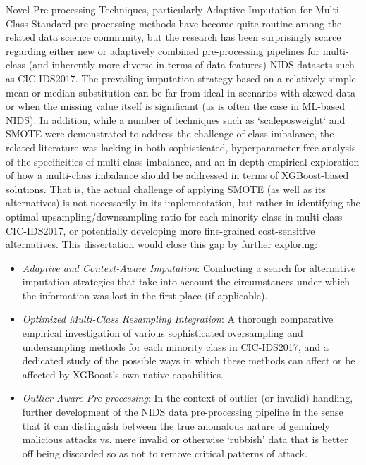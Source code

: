 Novel Pre-processing Techniques, particularly Adaptive Imputation for Multi-Class
Standard pre-processing methods have become quite routine among the related data science community, but the research has been surprisingly scarce regarding either new or adaptively combined pre-processing pipelines for multi-class (and inherently more diverse in terms of data features) NIDS datasets such as CIC-IDS2017. The prevailing imputation strategy based on a relatively simple mean or median substitution can be far from ideal in scenarios with skewed data or when the missing value itself is significant (as is often the case in ML-based NIDS). In addition, while a number of techniques such as `scale\textunderscore pos\textunderscore weight` and SMOTE were demonstrated to address the challenge of class imbalance, the related literature was lacking in both sophisticated, hyperparameter-free analysis of the specificities of multi-class imbalance, and an in-depth empirical exploration of how a multi-class imbalance should be addressed in terms of XGBoost-based solutions. That is, the actual challenge of applying SMOTE (as well as its alternatives) is not necessarily in its implementation, but rather in identifying the optimal upsampling/downsampling ratio for each minority class in multi-class CIC-IDS2017, or potentially developing more fine-grained cost-sensitive alternatives. This dissertation would close this gap by further exploring:
\begin{itemize}[noitemsep] 
\item \textit{Adaptive and Context-Aware Imputation}: Conducting a search for alternative imputation strategies that take into account the circumstances under which the information was lost in the first place (if applicable).
\item \textit{Optimized Multi-Class Resampling Integration}: A thorough comparative empirical investigation of various sophisticated oversampling and undersampling methods for each minority class in CIC-IDS2017, and a dedicated study of the possible ways in which these methods can affect or be affected by XGBoost's own native capabilities.
\item \textit{Outlier-Aware Pre-processing}: In the context of outlier (or invalid) handling, further development of the NIDS data pre-processing pipeline in the sense that it can distinguish between the true anomalous nature of genuinely malicious attacks vs. mere invalid or otherwise ‘rubbish' data that is better off being discarded so as not to remove critical patterns of attack.
\end{itemize} 

